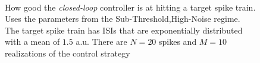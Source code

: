 \documentclass{article}
\begin{document}
\begin{figure}[htp]  
\begin{center}    \\
  \caption[ ]{How good the {\sl closed-loop} controller is at hitting a target
  spike train. Uses the parameters from the Sub-Threshold,High-Noise regime. The
  target spike train has ISIs that are exponentially distributed with a 
  mean of $1.5$ a.u. There are $N=20$ spikes and $M=10$ realizations of the
  control strategy}
  \label{fig:targettrain_cl_highnoise}
\end{center}
\end{figure}  
\end{document}

